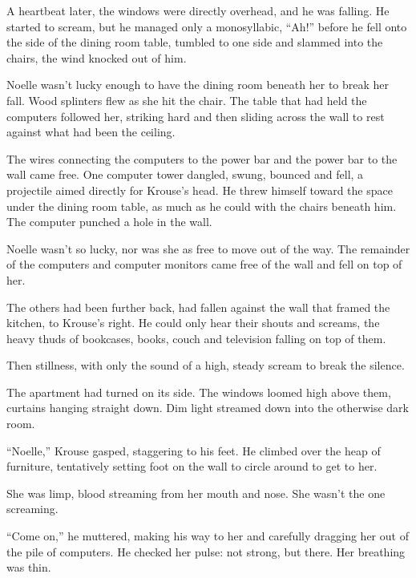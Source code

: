 A heartbeat later, the windows were directly overhead, and he was falling.  He started to scream, but he managed only a monosyllabic, ``Ah!'' before he fell onto the side of the dining room table, tumbled to one side and slammed into the chairs, the wind knocked out of him.



Noelle wasn't lucky enough to have the dining room beneath her to break her fall.  Wood splinters flew as she hit the chair.  The table that had held the computers followed her, striking hard and then sliding across the wall to rest against what had been the ceiling.



The wires connecting the computers to the power bar and the power bar to the wall came free.  One computer tower dangled, swung, bounced and fell, a projectile aimed directly for Krouse's head.  He threw himself toward the space under the dining room table, as much as he could with the chairs beneath him.  The computer punched a hole in the wall.



Noelle wasn't so lucky, nor was she as free to move out of the way.  The remainder of the computers and computer monitors came free of the wall and fell on top of her.



The others had been further back, had fallen against the wall that framed the kitchen, to Krouse's right.  He could only hear their shouts and screams, the heavy thuds of bookcases, books, couch and television falling on top of them.



Then stillness, with only the sound of a high, steady scream to break the silence.



The apartment had turned on its side.  The windows loomed high above them, curtains hanging straight down.  Dim light streamed down into the otherwise dark room.



``Noelle,'' Krouse gasped, staggering to his feet.  He climbed over the heap of furniture, tentatively setting foot on the wall to circle around to get to her.



She was limp, blood streaming from her mouth and nose.  She wasn't the one screaming.



``Come on,'' he muttered, making his way to her and carefully dragging her out of the pile of computers.  He checked her pulse: not strong, but there.  Her breathing was thin.



